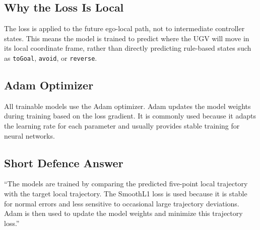 \documentclass[11pt,a4paper]{article}
\begin{document}
\subsection*{Why the Loss Is Local}
The loss is applied to the future ego-local path, not to intermediate controller
states. This means the model is trained to predict where the UGV will move in
its local coordinate frame, rather than directly predicting rule-based states
such as \texttt{toGoal}, \texttt{avoid}, or \texttt{reverse}.

\subsection*{Adam Optimizer}
All trainable models use the Adam optimizer. Adam updates the model weights
during training based on the loss gradient. It is commonly used because it
adapts the learning rate for each parameter and usually provides stable training
for neural networks.

\subsection*{Short Defence Answer}
``The models are trained by comparing the predicted five-point local trajectory
with the target local trajectory. The SmoothL1 loss is used because it is stable
for normal errors and less sensitive to occasional large trajectory deviations.
Adam is then used to update the model weights and minimize this trajectory
loss.''
\end{document}
